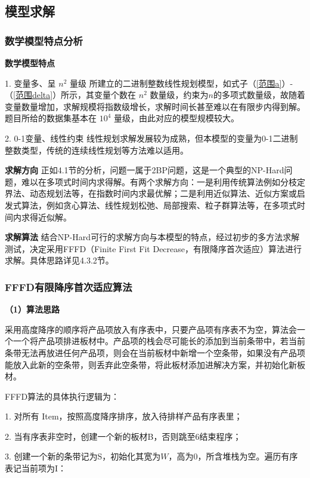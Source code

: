 \documentclass[bwprint]{gmcmthesis}
\begin{document}
\subsection{模型求解}
	
\subsubsection{数学模型特点分析}
	\textbf{数学模型特点} 
	
	1. 变量多、呈 $ n^2 $ 量级 \quad 所建立的二进制整数线性规划模型，如式子（\ref{范围a}）-（\ref{范围delta}）所示，其变量个数在 $ n^2 $ 数量级，约束为$ n $的多项式数量级，故随着变量数量增加，求解规模将指数级增长，求解时间长甚至难以在有限步内得到解。 题目所给的数据集基本在 $ 10^4 $ 量级，由此对应的模型规模较大。
	
	2. 0-1变量、线性约束 \quad	线性规划求解发展较为成熟，但本模型的变量为0-1二进制整数类型，传统的连续线性规划等方法难以适用。
	
	\textbf{求解方向} \quad 正如4.1节的分析，问题一属于2BP问题，这是一个典型的NP-Hard问题，难以在多项式时间内求得解。有两个求解方向：一是利用传统算法例如分枝定界法、动态规划法等，在指数时间内求最优解；二是利用近似算法、近似方案或启发式算法，例如贪心算法、线性规划松弛、局部搜索、粒子群算法等，在多项式时间内求得近似解。
	
	\textbf{求解算法} \quad 结合NP-Hard可行的求解方向与本模型的特点，经过初步的多方法求解测试，决定采用FFFD（Finite First Fit Decrease，有限降序首次适应）算法进行求解。具体思路详见4.3.2节。


\subsubsection{FFFD有限降序首次适应算法}
	\textbf{（1）算法思路}
	
	采用高度降序的顺序将产品项放入有序表中，只要产品项有序表不为空，算法会一个一个将产品项排进板材中。产品项的栈会尽可能长的添加到当前条带中，若当前条带无法再放进任何产品项，则会在当前板材中新增一个空条带，如果没有产品项能放入此新的空条带，则丢弃此空条带，将此板材添加进解决方案，并初始化新板材。
	
	FFFD算法的具体执行逻辑为：
	
	1. 对所有 {\rm Item}，按照高度降序排序，放入待排样产品有序表里；
	
	2. 当有序表非空时，创建一个新的板材B，否则跳至6结束程序；
	
	3. 创建一个新的条带记为S，初始化其宽为$W$，高为0，所含堆栈为空。遍历有序表记当前项为I：
	
\end{document}
